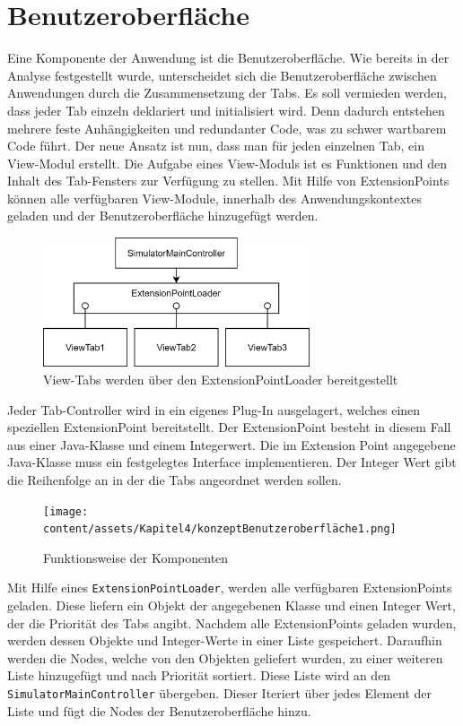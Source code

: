 \section{Benutzeroberfläche}

Eine Komponente der Anwendung ist die Benutzeroberfläche. Wie bereits in der Analyse festgestellt wurde, unterscheidet sich die Benutzeroberfläche zwischen Anwendungen durch die Zusammensetzung der Tabs. Es soll vermieden werden, dass jeder Tab einzeln deklariert und initialisiert wird. Denn dadurch entstehen mehrere feste Anhängigkeiten und redundanter Code, was zu schwer wartbarem Code führt. Der neue Ansatz ist nun, dass man für jeden einzelnen Tab, ein View-Modul erstellt. Die Aufgabe eines View-Moduls ist es Funktionen und den Inhalt des Tab-Fensters zur Verfügung zu stellen. Mit Hilfe von ExtensionPoints können alle verfügbaren View-Module, innerhalb des Anwendungskontextes geladen und der Benutzeroberfläche hinzugefügt werden.


\begin{figure}[ht]
    \centering
    \includegraphics[width=0.7\textwidth]{content/assets/Kapitel4/ExtensionPointEasy.png}
    \caption{View-Tabs werden über den ExtensionPointLoader bereitgestellt}
\end{figure}

Jeder Tab-Controller wird in ein eigenes Plug-In ausgelagert, welches einen speziellen ExtensionPoint bereitstellt. Der ExtensionPoint besteht in diesem Fall aus einer Java-Klasse und einem Integerwert. Die im Extension Point angegebene Java-Klasse muss ein festgelegtes Interface implementieren. Der Integer Wert gibt die Reihenfolge an in der die Tabs angeordnet werden sollen.

\begin{figure}[ht]
    \centering
    \texttt{[image: content/assets/Kapitel4/konzeptBenutzeroberfläche1.png]}
    \caption{Funktionsweise der Komponenten}
\end{figure}


Mit Hilfe eines \texttt{ExtensionPointLoader}, werden alle verfügbaren ExtensionPoints geladen. Diese liefern ein Objekt der angegebenen Klasse und einen Integer Wert, der die Priorität des Tabs angibt. Nachdem alle ExtensionPoints geladen wurden, werden dessen Objekte und Integer-Werte in einer Liste gespeichert. Daraufhin werden die Nodes, welche von den Objekten geliefert wurden, zu einer weiteren Liste hinzugefügt und nach Priorität sortiert. Diese Liste wird an den \texttt{SimulatorMainController} übergeben. Dieser Iteriert über jedes Element der Liste und fügt die Nodes der Benutzeroberfläche hinzu. 

